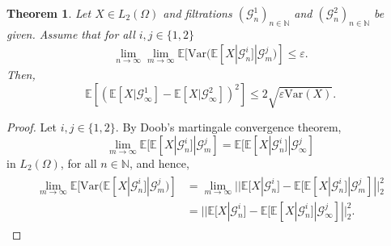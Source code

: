 \documentclass[a4paper, 10pt]{article}
\newtheorem{theorem}{Theorem}
\numberwithin{theorem}{section}
\theoremstyle{definition}
\newcommand{\N}{\mathbb{N}}
\newcommand{\E}{\mathbb{E}}
\newcommand{\G}{\mathcal{G}}
\newcommand{\Var}{\mathrm{Var}}
\renewcommand{\epsilon}{\varepsilon}
\begin{document}
	

\begin{theorem}\label{theo:dialoge_epsilon}
	Let $X \in L_2(\Omega)$ and filtrations $(\G^1_n)_{n \in \N}$ and $(\G^2_n)_{n \in \N}$ be given. Assume that for all $i,j \in \{1,2\}$
	\begin{align}\label{align:dialoge_epsilon}
	\lim_{n\to\infty} \lim_{m\to\infty} \E[ \Var(\E[X |\G^i_n]|\G^j_m)] \le \epsilon.
	\end{align}
	Then,
	$$  \E[( \E[X|\G^1_\infty] -  \E[X|  \G^2_\infty] )^2] \le  2\sqrt{\epsilon \Var(X)}.$$
\end{theorem}

\begin{proof}
Let $i,j \in \{1,2\}$. 
By Doob's martingale convergence theorem,
$$\lim_{m\to\infty} \E[ \E[X|\G^i_n]|\G^j_m] =  \E[ \E[X|\G^i_n]|\G^j_\infty] $$
 in $L_2(\Omega)$, for all $n \in \N$, and hence,
 \begin{align}\label{equ:dialoge_eps1}
 	\begin{split}
 	\lim_{m\to\infty}  \E[ \Var(\E[X |\G^i_n]|\G^j_m)]  &= \lim_{m\to\infty} || \E[X|\G^i_n] - \E[ \E[X|\G^i_n]|\G^j_m] ||^2_2 \\ &= || \E[X|\G^i_n] - \E[ \E[X|\G^i_n]|\G^j_\infty] ||^2_2.
 \end{split}
 \end{align}


\end{proof}
\end{document}
